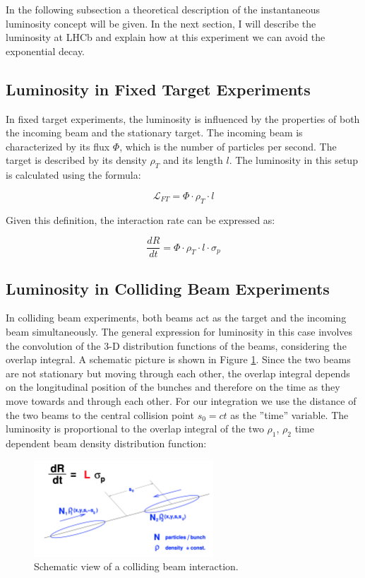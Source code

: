 In the following subsection a theoretical description of the instantaneous luminosity concept will be given.
In the next section, I will describe the luminosity at LHCb and explain how at this experiment we can avoid the exponential decay.

\subsection{Luminosity in Fixed Target Experiments}
In fixed target experiments, the luminosity is influenced by the properties of both the incoming beam and the stationary target. The incoming beam is characterized by its flux $\Phi$, which is the number of particles per second. The target is described by its density $\rho_T$ and its length $l$. The luminosity in this setup is calculated using the formula:

\[
\mathcal{L}_{FT} = \Phi \cdot \rho_T \cdot l
\]

Given this definition, the interaction rate can be expressed as:

\[
\frac{dR}{dt} = \Phi \cdot \rho_T \cdot l \cdot \sigma_p
\]

\subsection{Luminosity in Colliding Beam Experiments}
In colliding beam experiments, both beams act as the target and the incoming beam simultaneously. The general expression for luminosity in this case involves the convolution of the 3-D distribution functions of the beams, considering the overlap integral. A schematic picture is shown in Figure \ref{fig:lumi-def}\cite{Herr:941318}. Since the two beams are not stationary but moving through each other, the overlap integral depends on the longitudinal position of the bunches and therefore on the time as they move towards and through each other. For our integration we use the distance of the two beams to the central collision point $s_0 = ct$ as the ”time” variable. 
The luminosity is proportional to the overlap integral of the two  $\rho_1$, $\rho_2$ time dependent beam density distribution function:

\begin{figure}
    \centering
    \includegraphics[width=0.6\textwidth]{figures/luminosity_def.png}
    \caption{Schematic view of a colliding beam interaction.}
    \label{fig:lumi-def}
\end{figure}

